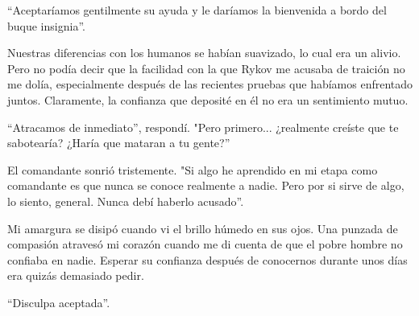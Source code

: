 ``Aceptaríamos gentilmente su ayuda y le daríamos la bienvenida a bordo del buque insignia''.

Nuestras diferencias con los humanos se habían suavizado, lo cual era un alivio. Pero no podía decir que la facilidad con la que Rykov me acusaba de traición no me dolía, especialmente después de las recientes pruebas que habíamos enfrentado juntos. Claramente, la confianza que deposité en él no era un sentimiento mutuo.

``Atracamos de inmediato'', respondí. "Pero primero... ¿realmente creíste que te sabotearía? ¿Haría que mataran a tu gente?''

El comandante sonrió tristemente. "Si algo he aprendido en mi etapa como comandante es que nunca se conoce realmente a nadie. Pero por si sirve de algo, lo siento, general. Nunca debí haberlo acusado''.

Mi amargura se disipó cuando vi el brillo húmedo en sus ojos. Una punzada de compasión atravesó mi corazón cuando me di cuenta de que el pobre hombre no confiaba en nadie. Esperar su confianza después de conocernos durante unos días era quizás demasiado pedir.

``Disculpa aceptada''.

